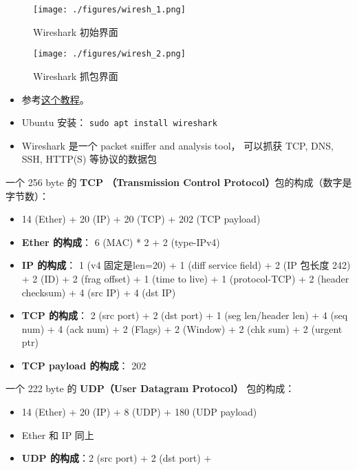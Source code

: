 
\begin{issues}
\issueDraft
\end{issues}

\begin{figure}[ht]
\centering
\texttt{[image: ./figures/wiresh\_1.png]}
\caption{Wireshark 初始界面} \label{wiresh_fig1}
\end{figure}

\begin{figure}[ht]
\centering
\texttt{[image: ./figures/wiresh\_2.png]}
\caption{Wireshark 抓包界面} \label{wiresh_fig2}
\end{figure}


\begin{itemize}
\item 参考\href{https://www.varonis.com/blog/how-to-use-wireshark}{这个教程}。
\item Ubuntu 安装： \verb|sudo apt install wireshark|
\item Wireshark 是一个 packet sniffer and analysis tool， 可以抓获 TCP, DNS, SSH, HTTP(S)   等协议的数据包
\end{itemize}

一个 256 byte 的 \textbf{TCP （Transmission Control Protocol）}包的构成（数字是字节数）：
\begin{itemize}
\item 14 (Ether) + 20 (IP) + 20 (TCP) + 202 (TCP payload)
\item \textbf{Ether 的构成}： 6 (MAC) * 2 + 2 (type-IPv4)
\item \textbf{IP 的构成}： 1 (v4 固定是len=20) + 1 (diff service field) + 2 (IP 包长度 242) + 2 (ID) + 2 (frag offset) + 1 (time to live) + 1 (protocol-TCP) + 2 (header checksum) + 4 (src IP) + 4 (dst IP)
\item \textbf{TCP 的构成}： 2 (src port) + 2 (dst port) + 1 (seg len/header len) + 4 (seq num) + 4 (ack num) + 2 (Flags) + 2 (Window) + 2 (chk sum) + 2 (urgent ptr)
\item \textbf{TCP payload 的构成}： 202
\end{itemize}

一个 222 byte 的 \textbf{UDP（User Datagram Protocol）} 包的构成：
\begin{itemize}
\item 14 (Ether) + 20 (IP) + 8 (UDP) + 180 (UDP payload)
\item Ether 和 IP 同上
\item \textbf{UDP 的构成}：2 (src port) + 2 (dst port) + 
\end{itemize}
